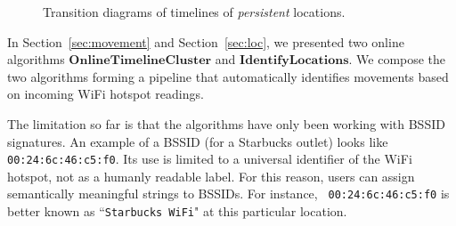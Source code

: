 \begin{figure}[t]
    \centering
    \caption{Transition diagrams of timelines of {\em persistent} locations.}
    \label{fig:persistent}
\end{figure}

In Section~\ref{sec:movement} and Section~\ref{sec:loc}, we presented two online
algorithms $\mathbf{OnlineTimelineCluster}$ and $\mathbf{IdentifyLocations}$.
We compose the two algorithms forming a pipeline that automatically identifies
movements based on incoming WiFi hotspot readings.

The limitation so far is that the algorithms have only been working with
BSSID signatures.  An example of a BSSID (for a Starbucks outlet) looks like 
{\tt 00:24:6c:46:c5:f0}.  Its use is limited to a universal identifier of the
WiFi hotspot, not as a humanly readable label.  For this reason, users can
assign semantically meaningful strings to BSSIDs.  For instance, {\tt
00:24:6c:46:c5:f0} is better known as ``{\tt Starbucks WiFi}" at this particular
location.

